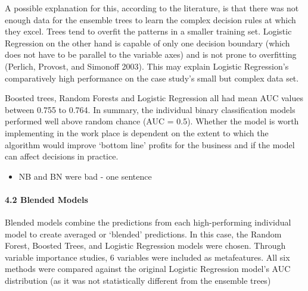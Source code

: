 \documentclass[]{elsarticle} %
\providecommand{\tightlist}{%
  \setlength{\itemsep}{0pt}\setlength{\parskip}{0pt}}
\begin{document}
A possible explanation for this, according to the literature, is that
there was not enough data for the ensemble trees to learn the complex
decision rules at which they excel. Trees tend to overfit the patterns
in a smaller training set. Logistic Regression on the other hand is
capable of only one decision boundary (which does not have to be
parallel to the variable axes) and is not prone to overfitting (Perlich,
Provost, and Simonoff 2003). This may explain Logistic Regression's
comparatively high performance on the case study's small but complex
data set.

Boosted trees, Random Forests and Logistic Regression all had mean AUC
values between 0.755 to 0.764. In summary, the individual binary
classification models performed well above random chance (AUC = 0.5).
Whether the model is worth implementing in the work place is dependent
on the extent to which the algorithm would improve `bottom line' profits
for the business and if the model can affect decisions in practice.

\begin{itemize}
\tightlist
\item
  NB and BN were bad - one sentence
\end{itemize}

\paragraph{4.2 Blended Models}\label{blended-models}

Blended models combine the predictions from each high-performing
individual model to create averaged or `blended' predictions. In this
case, the Random Forest, Boosted Trees, and Logistic Regression models
were chosen. Through variable importance studies, 6 variables were
included as metafeatures. All six methods were compared against the
original Logistic Regression model's AUC distribution (as it was not
statistically different from the ensemble trees)
\end{document}
